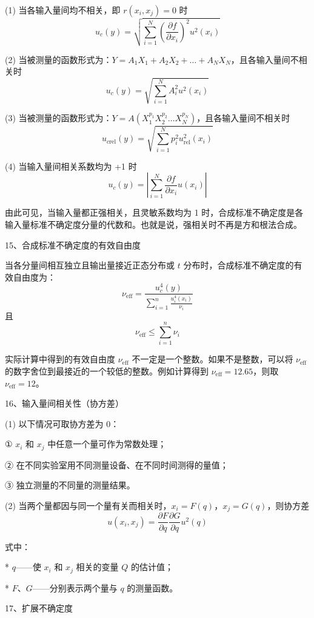 \documentclass[UTF8]{ctexart}
\begin{document}
(1) 当各输入量间均不相关，即 \(r(x_i, x_j) = 0\) 时
\[
u_c(y) = \sqrt{ \sum_{i=1}^{N} \left( \frac{\partial f}{\partial x_i} \right)^2 u^2(x_i) }
\]

(2) 当被测量的函数形式为：\(Y = A_1 X_1 + A_2 X_2 + \dots + A_N X_N\)，且各输入量间不相关时
\[
u_c(y) = \sqrt{ \sum_{i=1}^{N} A_i^2 u^2(x_i) }
\]

(3) 当被测量的函数形式为：\(Y = A(X_1^{p_1} X_2^{p_2} \dots X_N^{p_N})\)，且各输入量间不相关时
\[
u_{c\text{rel}}(y) = \sqrt{ \sum_{i=1}^{N} p_i^2 u_{\text{rel}}^2(x_i) }
\]

(4) 当输入量间相关系数均为 +1 时
\[
u_c(y) = \left| \sum_{i=1}^{N} \frac{\partial f}{\partial x_i} u(x_i) \right|
\]

由此可见，当输入量都正强相关，且灵敏系数均为 1 时，合成标准不确定度是各输入量标准不确定度分量的代数和。也就是说，强相关时不再是方和根法合成。

\vspace{5mm} 
15、合成标准不确定度的有效自由度

当各分量间相互独立且输出量接近正态分布或 \(t\) 分布时，合成标准不确定度的有效自由度为：
\[
\nu_{\text{eff}} = \frac{u_c^4(y)}{\sum_{i=1}^{n} \frac{u_i^4(x_i)}{\nu_i}}
\]
且
\[
\nu_{\text{eff}} \le \sum_{i=1}^{n} \nu_i
\]

实际计算中得到的有效自由度 \(\nu_{\text{eff}}\) 不一定是一个整数。如果不是整数，可以将 \(\nu_{\text{eff}}\) 的数字舍位到最接近的一个较低的整数。例如计算得到 \(\nu_{\text{eff}} = 12.65\)，则取 \(\nu_{\text{eff}} = 12\)。

\vspace{5mm} 
16、输入量间相关性（协方差）

(1) 以下情况可取协方差为 0：

① \(x_i\) 和 \(x_j\) 中任意一个量可作为常数处理；

② 在不同实验室用不同测量设备、在不同时间测得的量值；

③ 独立测量的不同量的测量结果。

(2) 当两个量都因与同一个量有关而相关时，\(x_i = F(q)\)，\(x_j = G(q)\)，则协方差
\[
u(x_i, x_j) = \frac{\partial F}{\partial q} \frac{\partial G}{\partial q} u^2(q)
\]

式中：

*   \(q\)——使 \(x_i\) 和 \(x_j\) 相关的变量 \(Q\) 的估计值；

*   \(F\)、\(G\)——分别表示两个量与 \(q\) 的测量函数。

\vspace{5mm} 
17、扩展不确定度
\end{document}
